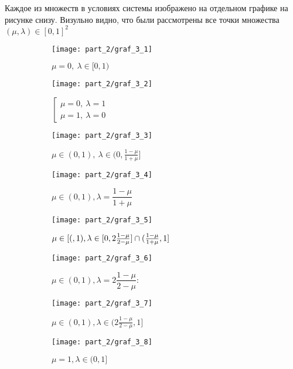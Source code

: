 Каждое из множеств в условиях системы изображено на отдельном графике
на рисунке снизу. Визульно видно, что были рассмотрены все точки
множества $(\mu, \lambda) \in [0,1]^2$

\begin{figure}[H]
	\centering
	\begin{subfigure}[b]{0.3 \textwidth}
		\texttt{[image: part\_2/graf\_3\_1]}
		\caption{$\mu = 0, \: \lambda \in [0, 1)$}
	\end{subfigure}
	\begin{subfigure}[b]{0.3 \textwidth}
		\texttt{[image: part\_2/graf\_3\_2]}
		\caption{
			$
			\left[
			\begin{array}{c}
     			\mu=0, \: \lambda = 1 \\
     			\mu=1, \: \lambda = 0
  			\end{array}
			\right.
			$
		}
	\end{subfigure}
	\begin{subfigure}[b]{0.3 \textwidth}	
		\texttt{[image: part\_2/graf\_3\_3]}
		\caption{
			$
				\mu \in (0,1), \:
				\lambda \in (0, \frac{1 - \mu}{1 + \mu}]
			$		
		}
	\end{subfigure}
	\newline	
	\centering
	\begin{subfigure}[b]{0.3 \textwidth}
		\texttt{[image: part\_2/graf\_3\_4]}
		\caption{
			$\mu \in (0,1), \lambda = \dfrac{1-\mu}{1+\mu}$		
		}
	\end{subfigure}
	\begin{subfigure}[b]{0.3 \textwidth}
		\texttt{[image: part\_2/graf\_3\_5]}
		\caption{
			$\mu \in [(, 1), \newline 
			\lambda \in 
			[0, 2\frac{1 - \mu}{2 - \mu}] \cap 
			(\frac{1 - \mu}{1 + \mu}, 1]$
		}
	\end{subfigure}
	\begin{subfigure}[b]{0.3 \textwidth}	
		\texttt{[image: part\_2/graf\_3\_6]}
		\caption{
			$\mu \in (0, 1), \lambda = 2\dfrac{1 - \mu}{2 - \mu}$: 
		}
	\end{subfigure}
	\newline
	\begin{subfigure}[b]{0.3 \textwidth}
		\texttt{[image: part\_2/graf\_3\_7]}
		\caption{
			$\mu \in (0, 1), 
			\lambda \in (2\frac{1 - \mu}{2 - \mu}, 1]$		
		}
	\end{subfigure}
	\begin{subfigure}[b]{0.3 \textwidth}
		\texttt{[image: part\_2/graf\_3\_8]}
		\caption{
			$\mu = 1, \lambda \in (0, 1] $		
		}
	\end{subfigure}
	\caption{}
\end{figure}